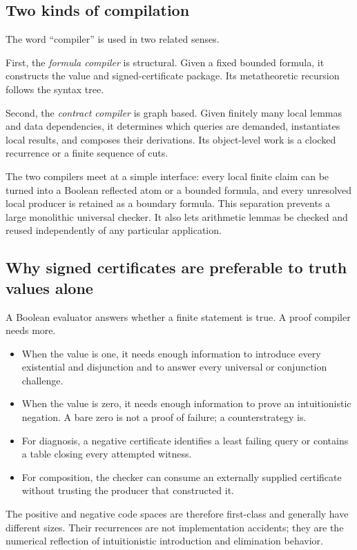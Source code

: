 \subsection{Two kinds of compilation}

The word ``compiler'' is used in two related senses.

First, the \emph{formula compiler} is structural.  Given a fixed bounded
formula, it constructs the value and signed-certificate package.  Its
metatheoretic recursion follows the syntax tree.

Second, the \emph{contract compiler} is graph based.  Given finitely many local
lemmas and data dependencies, it determines which queries are demanded,
instantiates local results, and composes their derivations.  Its object-level
work is a clocked recurrence or a finite sequence of cuts.

The two compilers meet at a simple interface: every local finite claim can be
turned into a Boolean reflected atom or a bounded formula, and every unresolved
local producer is retained as a boundary formula.  This separation prevents a
large monolithic universal checker.  It also lets arithmetic lemmas be checked
and reused independently of any particular application.

\subsection{Why signed certificates are preferable to truth values alone}

A Boolean evaluator answers whether a finite statement is true.  A proof
compiler needs more.

\begin{itemize}
\item When the value is one, it needs enough information to introduce every
existential and disjunction and to answer every universal or conjunction
challenge.
\item When the value is zero, it needs enough information to prove an
intuitionistic negation.  A bare zero is not a proof of failure; a
counterstrategy is.
\item For diagnosis, a negative certificate identifies a least failing query or
contains a table closing every attempted witness.
\item For composition, the checker can consume an externally supplied
certificate without trusting the producer that constructed it.
\end{itemize}

The positive and negative code spaces are therefore first-class and generally
have different sizes.  Their recurrences are not implementation accidents;
they are the numerical reflection of intuitionistic introduction and
elimination behavior.
